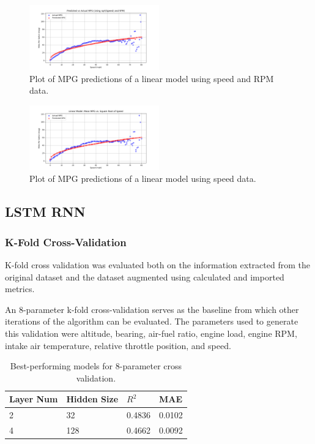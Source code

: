\documentclass[letterpaper]{article}
\begin{document}
\begin{figure}[htbp]
    \centering
    \includegraphics[width=0.5\textwidth]{figures/sqrt_speed_rpm_vs_mpg_multiregression_model.png}
    \caption{Plot of MPG predictions of a linear model using speed and RPM data.}
    \label{fig:rpmspeedvsmpg}
\end{figure}

\begin{figure}[htbp]
    \centering
    \includegraphics[width=0.5\textwidth]{figures/speed_vs_mpg_linear_model.png}
    \caption{Plot of MPG predictions of a linear model using speed data.}
    \label{fig:speedvsmpglinear}
\end{figure}


\subsection*{LSTM RNN}

\subsubsection*{K-Fold Cross-Validation}

K-fold cross validation was evaluated both on the information extracted 
from the original dataset and the dataset augmented using calculated and 
imported metrics.

An 8-parameter k-fold cross-validation serves as the baseline from which 
other iterations of the algorithm can be evaluated. The parameters used to 
generate this validation were altitude, bearing, air-fuel ratio, engine 
load, engine RPM, intake air temperature, relative throttle position, and 
speed.

\begin{table}[]
    \begin{tabular}{|l|l|l|l|}
        \hline
        \textbf{Layer Num} & \textbf{Hidden Size} & \textbf{$R^{2}$} & \textbf{MAE} \\
        \hline
        2                  & 32                   & 0.4836      & 0.0102       \\
        4                  & 128                  & 0.4662      & 0.0092       \\
        \hline
    \end{tabular}
    \caption{Best-performing models for 8-parameter cross validation.}
    \label{tab:tb1}
\end{table}
\end{document}
